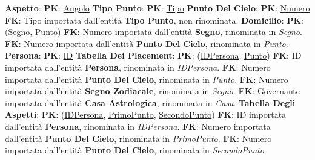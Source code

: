 \textbf{Aspetto}:\newline
\textbf{PK}: \underline{Angolo}\newline\newline
\textbf{Tipo Punto}:\newline
\textbf{PK}: \underline{Tipo}\newline\newline
\textbf{Punto Del Cielo}:
\textbf{PK}: \underline{Numero}\newline
\textbf{FK}: Tipo importata dall'entità \textbf{Tipo Punto}, non rinominata.\newline\newline
\textbf{Domicilio}:
\textbf{PK}: (\underline{Segno}, \underline{Punto})\newline
\textbf{FK}: Numero importata dall'entità \textbf{Segno}, rinominata in \textit{Segno}.\newline
\textbf{FK}: Numero importata dall'entità \textbf{Punto Del Cielo}, rinominata in \textit{Punto}.\newline\newline
\textbf{Persona}:\newline
\textbf{PK}: \underline{ID}\newline\newline
\textbf{Tabella Dei Placement}:\newline
\textbf{PK}: (\underline{IDPersona}, \underline{Punto})\newline
\textbf{FK}: ID importata dall'entità \textbf{Persona}, rinominata in \textit{IDPersona}.\newline
\textbf{FK}: Numero importata dall'entità \textbf{Punto Del Cielo}, rinominata in \textit{Punto}.\newline
\textbf{FK}: Numero importata dall'entità \textbf{Segno Zodiacale}, rinominata in \textit{Segno}.\newline
\textbf{FK}: Governante importata dall'entità \textbf{Casa Astrologica}, rinominata in \textit{Casa}.\newline\newline
\textbf{Tabella Degli Aspetti}:\newline
\textbf{PK}: (\underline{IDPersona}, \underline{PrimoPunto}, \underline{SecondoPunto})\newline
\textbf{FK}: ID importata dall'entità \textbf{Persona}, rinominata in \textit{IDPersona}.\newline
\textbf{FK}: Numero importata dall'entità \textbf{Punto Del Cielo}, rinominata in \textit{PrimoPunto}.\newline
\textbf{FK}: Numero importata dall'entità \textbf{Punto Del Cielo}, rinominata in \textit{SecondoPunto}.\newline
